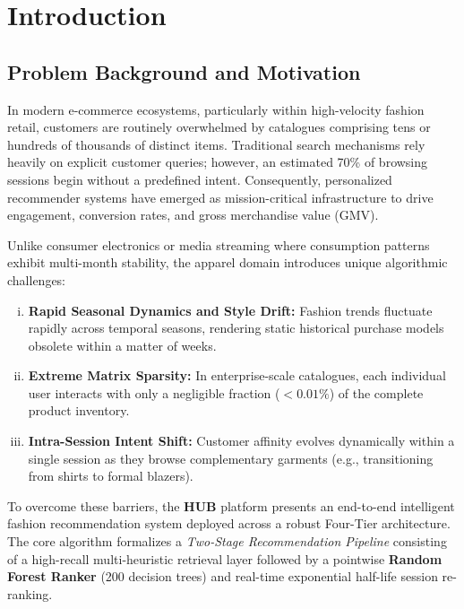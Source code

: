 \section{Introduction}

\subsection{Problem Background and Motivation}
In modern e-commerce ecosystems, particularly within high-velocity fashion retail, customers are routinely overwhelmed by catalogues comprising tens or hundreds of thousands of distinct items. Traditional search mechanisms rely heavily on explicit customer queries; however, an estimated 70\% of browsing sessions begin without a predefined intent. Consequently, personalized recommender systems have emerged as mission-critical infrastructure to drive engagement, conversion rates, and gross merchandise value (GMV).

Unlike consumer electronics or media streaming where consumption patterns exhibit multi-month stability, the apparel domain introduces unique algorithmic challenges:
\begin{enumerate}[(i)]
    \item \textbf{Rapid Seasonal Dynamics and Style Drift:} Fashion trends fluctuate rapidly across temporal seasons, rendering static historical purchase models obsolete within a matter of weeks.
    \item \textbf{Extreme Matrix Sparsity:} In enterprise-scale catalogues, each individual user interacts with only a negligible fraction ($< 0.01\%$) of the complete product inventory.
    \item \textbf{Intra-Session Intent Shift:} Customer affinity evolves dynamically within a single session as they browse complementary garments (e.g., transitioning from shirts to formal blazers).
\end{enumerate}

To overcome these barriers, the \textbf{HUB} platform presents an end-to-end intelligent fashion recommendation system deployed across a robust Four-Tier architecture. The core algorithm formalizes a \textit{Two-Stage Recommendation Pipeline} consisting of a high-recall multi-heuristic retrieval layer followed by a pointwise \textbf{Random Forest Ranker} (200 decision trees) and real-time exponential half-life session re-ranking.

